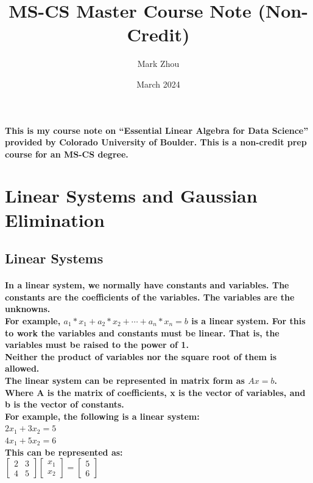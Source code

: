 \documentclass{article}
\title{MS-CS Master Course Note (Non-Credit)}
\author{Mark Zhou}
\date{March 2024}
\begin{document}
\maketitle
\doublespacing

\paragraph{This is my course note on “Essential Linear Algebra for Data Science” provided by Colorado University of Boulder. 
This is a non-credit prep course for an MS-CS degree.}

\newpage
\tableofcontents
\newpage

\section{Linear Systems and Gaussian Elimination}

\subsection{Linear Systems}

\paragraph{In a linear system, we normally have constants and variables. The constants are the coefficients of the variables. The variables are the unknowns.\\
For example, $a_1*x_1 + a_2*x_2 + \cdots + a_n*x_n = b$ is a linear system. For this to work the variables and constants must be linear. 
That is, the variables must be raised to the power of 1.\\
Neither the product of variables nor the square root of them is allowed.\\
The linear system can be represented in matrix form as $Ax = b$.\\
Where A is the matrix of coefficients, x is the vector of variables, and b is the vector of constants.\\
\hfill
For example, the following is a linear system:\\
$2x_1 + 3x_2 = 5$\\
$4x_1 + 5x_2 = 6$\\
This can be represented as:\\
$\begin{bmatrix} 2 & 3 \\ 4 & 5 \end{bmatrix} 
\begin{bmatrix} x_1 \\ x_2 \end{bmatrix} = 
\begin{bmatrix} 5 \\ 6 \end{bmatrix}$\\}
\end{document}
